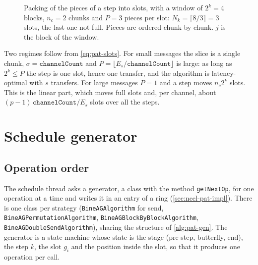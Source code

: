 \begin{figure}[t]
\centering
{}
\caption{Packing of the pieces of a step into slots, with a window of $2^k=4$ blocks, $n_c=2$ chunks and $P=3$ pieces per slot: $N_k=\lceil 8/3\rceil=3$ slots, the last one not full. Pieces are ordered chunk by chunk. $j$ is the block of the window.}
\label{fig:pat-slots}
\end{figure}

Two regimes follow from \cref{eq:pat-slots}.
For small messages the slice is a single chunk, $\sigma=\texttt{channelCount}$ and $P=\lfloor E_s/\texttt{channelCount}\rfloor$ is large: as long as $2^k\le P$ the step is one slot, hence one transfer, and the algorithm is latency-optimal with $s$ transfers.
For large messages $P=1$ and a step moves $n_c2^k$ slots. This is the linear part, which moves full slots and, per channel, about $(p-1)\,\texttt{channelCount}/E_s$ slots over all the steps.

\section{Schedule generator}\label{sec:pat-gen}

\subsection{Operation order}

The schedule thread asks a generator, a class with the method \texttt{getNextOp}, for one operation at a time and writes it in an entry of a ring (\cref{sec:nccl-pat-impl}).
There is one class per strategy (\texttt{BineAGAlgorithm} for send, \texttt{BineAGPermutationAlgorithm}, \texttt{BineAGBlockByBlockAlgorithm}, \texttt{BineAGDoubleSendAlgorithm}), sharing the structure of \cref{alg:pat-gen}.
The generator is a state machine whose state is the stage (pre-step, butterfly, end), the step $k$, the slot $g_i$ and the position inside the slot, so that it produces one operation per call.

